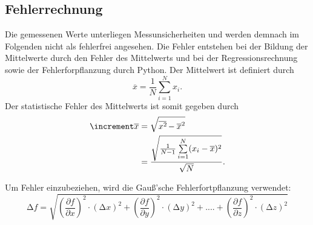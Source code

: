\subsection{Fehlerrechnung}
Die gemessenen Werte unterliegen Messunsicherheiten und werden demnach im
Folgenden nicht als fehlerfrei angesehen. Die Fehler entstehen bei der
Bildung der Mittelwerte durch den Fehler des Mittelwerts und bei der
Regressionsrechnung sowie der Fehlerforpflanzung durch Python.
Der Mittelwert ist definiert durch
\begin{equation}
    \overline{x} = \frac{1}{N} \sum\limits_{i=1}^N x_i.
\end{equation}
\noindent Der statistische Fehler des Mittelwerts ist somit gegeben durch 
\begin{equation}
    \begin{aligned}
        \increment \overline{x} &= \sqrt{\overline{x^2\kern-0.1em} - \overline{x}^2} \\
                            &= \frac{\sqrt{\frac{1}{N-1} \sum\limits_{i=1}^N (x_i - \overline{x})^2}}{\sqrt{N}}.
    \end{aligned}
\end{equation}

Um Fehler einzubeziehen, wird die Gauß'sche Fehlerfortpflanzung verwendet:
\begin{equation}
    \label{eqn:9}
    \increment f = \sqrt{\left(\frac{\partial f}{\partial x}\right)^2 \cdot \left(\increment x\right)^2 + \left(\frac{\partial f}{\partial y}\right)^2 \cdot \left(\increment y\right)^2 + .... + \left(\frac{\partial f}{\partial z}\right)^2 \cdot \left(\increment z\right)^2}
\end{equation}

